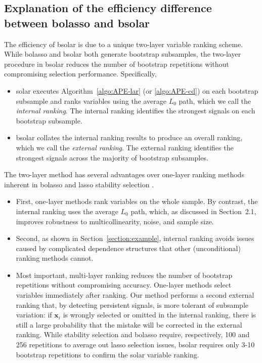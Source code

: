 \documentclass[11pt,review,authoryear]{elsarticle}
\begin{document}
\subsection{Explanation of the efficiency difference between bolasso and bsolar}

The efficiency of bsolar is due to a unique two-layer variable ranking scheme. While bolasso and bsolar both generate bootstrap subsamples, the two-layer procedure in bsolar reduces the number of bootstrap repetitions without compromising selection performance. Specifically,

\begin{itemize}

  \item     solar executes Algorithm~\ref{algo:APE-lar} (or \ref{algo:APE-cd}) on each bootstrap subsample and ranks variables using the average $L_0$ path, which we call the \emph{internal ranking}. The internal ranking identifies the strongest signals on each bootstrap subsample.

  \item     bsolar collates the internal ranking results to produce an overall ranking, which we call the \emph{external ranking}. The external ranking identifies the strongest signals across the majority of bootstrap subsamples.
\end{itemize}

The two-layer method has several advantages over one-layer ranking methods inherent in bolasso and lasso stability selection \citep{fan2008sure, hall2009usingb, hall2009using, li2012robust, li2012feature}.
\begin{itemize}
  \item First, one-layer methods rank variables on the whole sample. By contrast, the internal ranking uses the average $L_0$ path, which, as discussed in Section~2.1, improves robustness to multicollinearity, noise, and sample size.
  \item Second, as shown in Section~\ref{section:example}, internal ranking avoids issues caused by complicated dependence structures that other (unconditional) ranking methods cannot.
  \item Most important, multi-layer ranking reduces the number of bootstrap repetitions without compromising accuracy. One-layer methods select variables immediately after ranking. Our method performs a second external ranking that, by detecting persistent signals, is more tolerant of subsample variation: if $\mathbf{x}_i$ is wrongly selected or omitted in the internal ranking, there is still a large probability that the mistake will be corrected in the external ranking. While stability selection and bolasso require, respectively, 100 and 256 repetitions to average out lasso selection issues, bsolar requires only 3-10 bootstrap repetitions to confirm the solar variable ranking.
\end{itemize}
\end{document}
